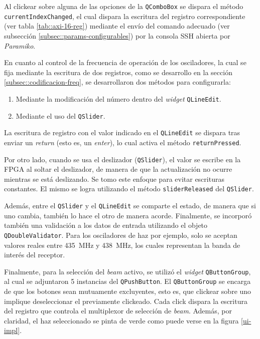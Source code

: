 \documentclass[../../main.tex]{subfiles}
\begin{document}
Al clickear sobre alguna de las opciones de la \texttt{QComboBox} se dispara el método \texttt{currentIndexChanged}, el cual dispara la escritura del registro correspondiente (ver tabla \ref{tab::axi-16-reg}) mediante el envío del comando adecuado (ver subsección \ref{subsec::params-configurables}) por la consola SSH abierta por \textit{Paramiko}.

En cuanto al control de la frecuencia de operación de los osciladores, la cual se fija mediante la escritura de dos registros, como se desarrollo en la sección \ref{subsec::codificacion-freq}, se desarrollaron dos métodos para configurarla:
\begin{enumerate}
    \item Mediante la modificación del número dentro del \textit{widget} \texttt{QLineEdit}.
    \item Mediante el uso del \texttt{QSlider}.
\end{enumerate}

La escritura de registro con el valor indicado en el \texttt{QLineEdit} se dispara tras enviar un \textit{return} (esto es, un \textit{enter}), lo cual activa el método \texttt{returnPressed}.

Por otro lado, cuando se usa el deslizador (\texttt{QSlider}), el valor se escribe en la FPGA al soltar el deslizador, de manera de que la actualización no ocurre mientras se está deslizando. Se tomo este enfoque para evitar escrituras constantes. El mismo se logra utilizando el método \texttt{sliderReleased} del \texttt{QSlider}.

Además, entre el \texttt{QSlider} y el \texttt{QLineEdit} se comparte el estado, de manera que si uno cambia, también lo hace el otro de manera acorde. Finalmente, se incorporó también una validación a los datos de entrada utilizando el objeto \texttt{QDoubleValidator}. Para los osciladores de haz por ejemplo, solo se aceptan valores reales entre 435~MHz y 438~MHz, los cuales representan la banda de interés del receptor.

Finalmente, para la selección del \textit{beam} activo, se utilizó el \textit{widget} \texttt{QButtonGroup}, al cual se adjuntaron 5 instancias del \texttt{QPushButton}. El \texttt{QButtonGroup} se encarga de que los botones sean mutuamente excluyentes, esto es, que clickear sobre uno implique deseleccionar el previamente clickeado. Cada click dispara la escritura del registro que controla el multiplexor de selección de \textit{beam}. Además, por claridad, el haz seleccionado se pinta de verde como puede verse en la figura \ref{ui-impl}.
\end{document}
